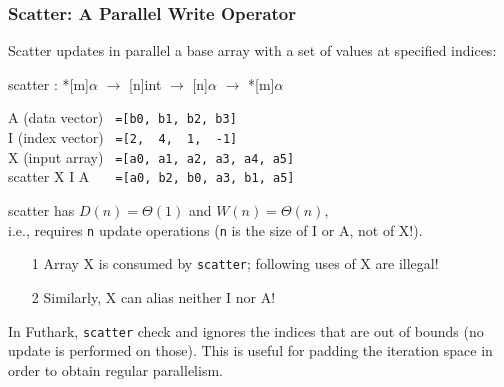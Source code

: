 \documentclass{beamer}
\renewcommand{\emph}[1]{\textcolor{structure}{#1}}
\newcommand{\emp}[1]{\textcolor{DikuRed}{ #1}}
\begin{document}
\begin{frame}[fragile,t]
  \frametitle{Scatter: A Parallel Write Operator}

Scatter \emph{updates in parallel} a base array with a set of values at specified indices:
\smallskip

\emph{scatter : *[m]$\alpha$ $\rightarrow$ [n]int $\rightarrow$ [n]$\alpha$ $\rightarrow$ *[m]$\alpha$}
\bigskip

A (data vector)    {\tt~=[b0, b1, b2, b3]}\\
I (index vector)   {\tt~=[2,~~4,~~1,~~-1]}\\
X (input array)    {\tt~=[a0,~a1,~a2,~a3,~a4,~a5]}\\
\emp{scatter X I A {\tt~~~=[a0,~b2,~b0,~a3,~b1,~a5]}}
\bigskip\pause

\emph{scatter} has $D(n)=\Theta(1)$ and $W(n)=\Theta(n)$,\\
i.e., requires {\tt n} update operations ({\tt n} is the size of I or A, not of X!). 
\smallskip 

\begin{itemize}
\item[1] \emp{Array X is consumed by {\tt scatter}; following uses of X are illegal!}\\
\item[2] \emp{Similarly, X can alias neither I nor A!}
\end{itemize}
\smallskip 

In Futhark, {\tt scatter} check and ignores the indices that are out of bounds (no update is performed on those).
This is useful for padding the iteration space in order to obtain regular parallelism. 
\end{frame}
\end{document}
